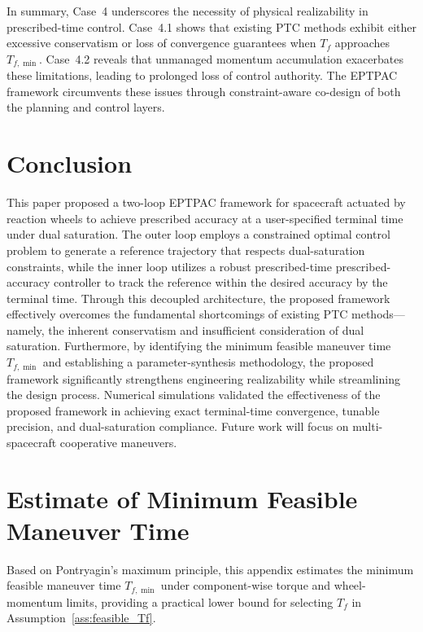 \documentclass[journal]{new-aiaa}
\begin{document}
In summary, Case~4 underscores the necessity of physical realizability in prescribed-time control. Case~4.1 shows that existing PTC methods exhibit either excessive conservatism or loss of convergence guarantees when $T_f$ approaches $T_{f,\min}$. Case~4.2 reveals that unmanaged momentum accumulation exacerbates these limitations, leading to prolonged loss of control authority. The EPTPAC framework circumvents these issues through constraint-aware co-design of both the planning and control layers.

\section{Conclusion}
\label{section:conclusion}
This paper proposed a two-loop EPTPAC framework for spacecraft actuated by reaction wheels to achieve prescribed accuracy at a user-specified terminal time under dual saturation.
The outer loop employs a constrained optimal control problem to generate a reference trajectory that respects dual-saturation constraints, while the inner loop utilizes a robust prescribed-time prescribed-accuracy controller to track the reference within the desired accuracy by the terminal time.
Through this decoupled architecture, the proposed framework effectively overcomes the fundamental shortcomings of existing PTC methods---namely, the inherent conservatism and insufficient consideration of dual saturation. Furthermore, by identifying the minimum feasible maneuver time $T_{f,\min}$ and establishing a parameter-synthesis methodology, the proposed framework significantly strengthens engineering realizability while streamlining the design process.
Numerical simulations validated the effectiveness of the proposed framework in achieving exact terminal-time convergence, tunable precision, and dual-saturation compliance.
Future work will focus on multi-spacecraft cooperative maneuvers.

\appendix
\section{Estimate of Minimum Feasible Maneuver Time}
\label{app:bangbang}

Based on Pontryagin's maximum principle, this appendix estimates the minimum feasible maneuver time $T_{f,\min}$ under component-wise torque and wheel-momentum limits, providing a practical lower bound for selecting $T_f$ in Assumption~\ref{ass:feasible_Tf}.
\end{document}
